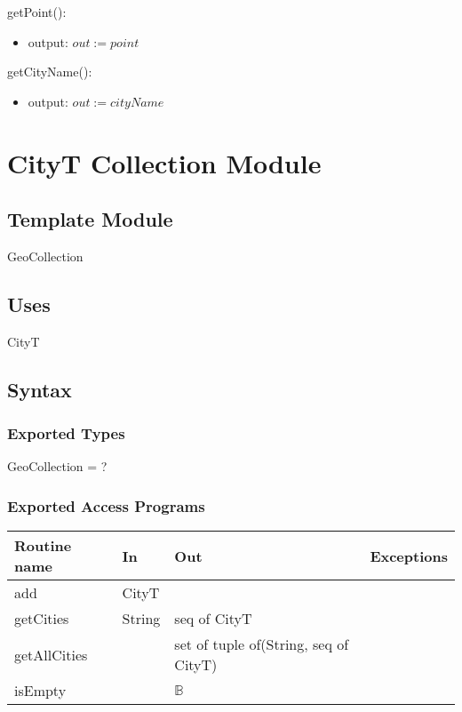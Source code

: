 \documentclass[12pt]{article}
\begin{document}
\noindent getPoint():
\begin{itemize}
\item output: $\mathit{out} := point$ 
\end{itemize}

\noindent getCityName():
\begin{itemize}
\item output: $\mathit{out} := cityName$
\end{itemize}





\newpage

\section* {CityT Collection Module}

\subsection* {Template Module}

GeoCollection

\subsection* {Uses}

CityT

\subsection* {Syntax}

\subsubsection* {Exported Types}

GeoCollection = ?


\subsubsection* {Exported Access Programs}

\begin{tabular}{| l | l | l | l |}
\hline
\textbf{Routine name} & \textbf{In} & \textbf{Out} & \textbf{Exceptions}\\
\hline
add & CityT &  & \\
\hline
getCities & String & seq of CityT & \\
\hline
getAllCities &  & set of tuple of(String, seq of CityT)& \\
\hline
isEmpty &  & $\mathbb{B}$ & \\
\hline
\end{tabular}
\end{document}
